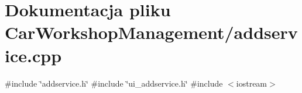 \section{Dokumentacja pliku Car\+Workshop\+Management/addservice.cpp}
\label{addservice_8cpp}
{\ttfamily \#include \char`\"{}addservice.\+h\char`\"{}}\newline
{\ttfamily \#include \char`\"{}ui\+\_\+addservice.\+h\char`\"{}}\newline
{\ttfamily \#include $<$iostream$>$}\newline
